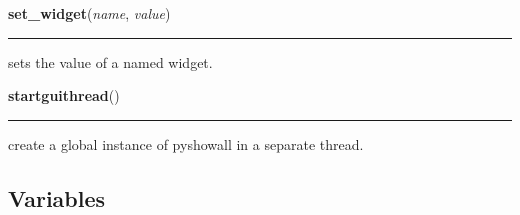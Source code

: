     \label{pyshowall:pyshowall:set_widget}

    \vspace{0.5ex}

    \begin{boxedminipage}{\textwidth}

    \raggedright \textbf{set\_widget}(\textit{name}, \textit{value})

    \vspace{-1.5ex}

    \rule{\textwidth}{0.5\fboxrule}
    sets the value of a named widget.

    \vspace{1ex}

    \end{boxedminipage}

    \label{pyshowall:pyshowall:startguithread}

    \vspace{0.5ex}

    \begin{boxedminipage}{\textwidth}

    \raggedright \textbf{startguithread}()

    \vspace{-1.5ex}

    \rule{\textwidth}{0.5\fboxrule}
    create a global instance of pyshowall in a separate thread.

    \vspace{1ex}

    \end{boxedminipage}



  \subsection{Variables}

